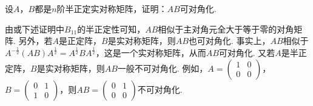 \documentclass[../../main.tex]{subfiles}
\begin{document}
\begin{proposition}\label{proposition:例9.73}
设\(A\)，\(B\)都是\(n\)阶半正定实对称矩阵，证明：\(AB\)可对角化.
\end{proposition}
\begin{remark}
由或下述证明中\(B_{11}\)的半正定性可知，\(AB\)相似于主对角元全大于等于零的对角矩阵. 另外，若\(A\)是正定阵，\(B\)是实对称矩阵，则\(AB\)也可对角化. 事实上，\(AB\)相似于\(A^{-\frac{1}{2}}(AB)A^{\frac{1}{2}}=A^{\frac{1}{2}}BA^{\frac{1}{2}}\)，这是一个实对称矩阵，从而\(AB\)可对角化. 又若\(A\)是半正定阵，\(B\)是实对称矩阵，则\(AB\)一般不可对角化. 例如，\(A=\begin{pmatrix}1&0\\0&0\end{pmatrix}\)，\(B=\begin{pmatrix}0&1\\1&0\end{pmatrix}\)，则\(AB=\begin{pmatrix}0&1\\0&0\end{pmatrix}\)不可对角化. 
\end{remark}
\end{document}
